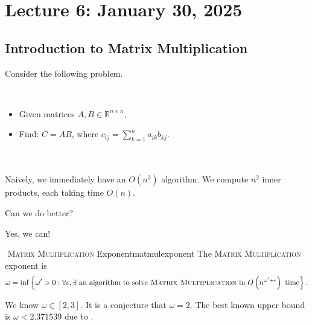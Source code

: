 \section{Lecture 6: January 30, 2025}

    \subsection{Introduction to Matrix Multiplication}

        Consider the following problem.
        \begin{compprob} \label{prob:matmul}
            \vphantom
            \\
            \begin{itemize}
                \item Given matrices \(A,B\in\mathbb{R}^{n\times n}\),
                \item Find: \(C=AB\), where \(c_{ij}=\sum_{k=1}^n a_{ik}b_{kj}\).
            \end{itemize}
        \end{compprob}
        \vphantom
        \\
        \\
        Naively, we immediately have an \(O(n^3)\) algorithm. We compute \(n^2\) inner products, each taking time \(O(n)\).
        \begin{question*}
            Can we do better?
        \end{question*}
        \begin{answer*}
            Yes, we can!
        \end{answer*}
        \begin{definition}{\Stop\,\,\textsc{Matrix Multiplication} Exponent}{matmulexponent}
            The \textsc{Matrix Multiplication} exponent is
            \begin{equation*}
                \omega=\inf\left\{\omega'>0:\forall\epsilon, \exists \text{ an algorithm to solve}\textsc{ Matrix Multiplication}\text{ in }O\left(n^{\omega'+\epsilon}\right)\text{ time}\right\}.
            \end{equation*}
        \end{definition}
        \begin{remark*}
            We know \(\omega\in[2,3]\). It is a conjecture that \(\omega=2\). The best known upper bound is \(\omega<2.371539\) due to .
        \end{remark*}
        \vphantom
        \\
